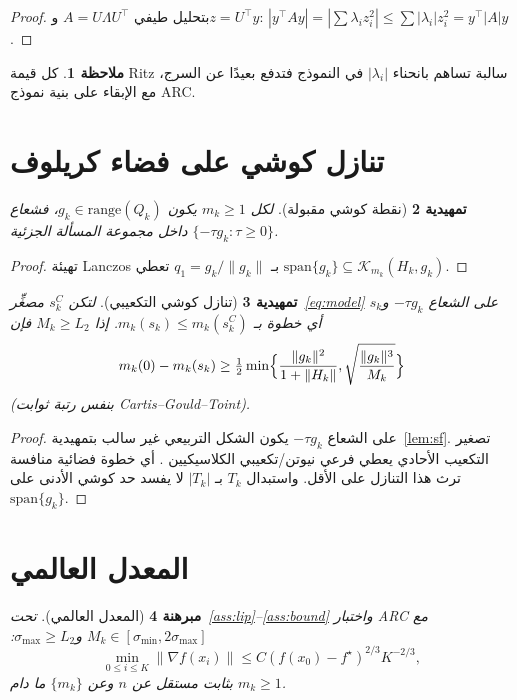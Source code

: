 \documentclass[12pt,a4paper]{article}
\newtheorem{theorem}{مبرهنة}
\newtheorem{lemma}[theorem]{تمهيدية}
\theoremstyle{definition}
\newtheorem{remark}[theorem]{ملاحظة}
\begin{document}
\begin{proof}
بتحليل طيفي $A=U\Lambda U^\top$ و$z=U^\top y$:
$|y^\top A y|=|\sum\lambda_i z_i^2|\le\sum|\lambda_i|z_i^2=y^\top|A|y$.
\end{proof}

\begin{remark}
كل قيمة \textenglish{Ritz} سالبة تساهم بانحناء $|\lambda_i|$ في النموذج
فتدفع بعيدًا عن السرج، مع الإبقاء على بنية نموذج \textenglish{ARC}.
\end{remark}

\section{تنازل كوشي على فضاء كريلوف}
\begin{lemma}[نقطة كوشي مقبولة]\label{lem:cauchy}
لكل $m_k\ge 1$ يكون $g_k\in\mathrm{range}(Q_k)$، فشعاع
$\{-\tau g_k:\tau\ge 0\}$ داخل مجموعة المسألة الجزئية.
\end{lemma}

\begin{proof}
تهيئة \textenglish{Lanczos} بـ $q_1=g_k/\|g_k\|$ تعطي
$\mathrm{span}\{g_k\}\subseteq\mathcal{K}_{m_k}(H_k,g_k)$.
\end{proof}

\begin{lemma}[تنازل كوشي التكعيبي]\label{lem:dec}
لتكن $s_k^C$ مصغِّر~\eqref{eq:model} على الشعاع $-\tau g_k$ و$s_k$ أي خطوة
بـ $m_k(s_k)\le m_k(s_k^C)$. إذا $M_k\ge L_2$ فإن
\[
m_k(0)-m_k(s_k)
\ge
\tfrac12\min\Bigl\{\frac{\|g_k\|^2}{1+\|H_k\|},\sqrt{\frac{\|g_k\|^3}{M_k}}\Bigr\}
\]
(بنفس رتبة ثوابت \textenglish{Cartis--Gould--Toint}).
\end{lemma}

\begin{proof}
على الشعاع $-\tau g_k$ يكون الشكل التربيعي غير سالب بتمهيدية~\ref{lem:sf}.
تصغير التكعيب الأحادي يعطي فرعي نيوتن/تكعيبي الكلاسيكيين
\cite{nesterov2006,cartis2011}. أي خطوة فضائية منافسة ترث هذا التنازل على
الأقل. واستبدال $T_k$ بـ $|T_k|$ لا يفسد حد كوشي الأدنى على
$\mathrm{span}\{g_k\}$.
\end{proof}

\section{المعدل العالمي}
\begin{theorem}[المعدل العالمي]\label{thm:global}
تحت~\ref{ass:lip}--\ref{ass:bound} واختبار \textenglish{ARC} مع
$M_k\in[\sigma_{\min},2\sigma_{\max}]$ و$\sigma_{\max}\ge L_2$:
\[
\min_{0\le i\le K}\|\nabla f(x_i)\|
\le
C(f(x_0)-f^\star)^{2/3}K^{-2/3},
\]
بثابت مستقل عن $n$ وعن $\{m_k\}$ ما دام $m_k\ge 1$.
\end{theorem}
\end{document}
